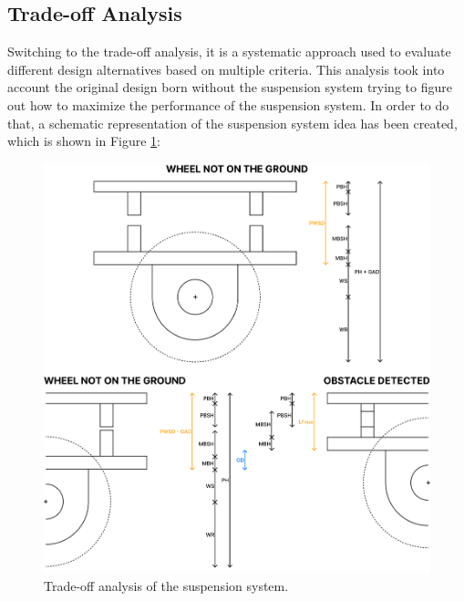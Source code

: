 \documentclass[11pt]{article}
\begin{document}
\newpage

\subsection{Trade-off Analysis}
Switching to the trade-off analysis, it is a systematic approach used to evaluate different design alternatives based on multiple criteria. This analysis took into account the original design born without the suspension system trying to figure out how to maximize the performance of the suspension system. In order to do that, a schematic representation of the suspension system idea has been created, which is shown in Figure \ref{fig:trade_off_analysis}:
\begin{figure}[H]
    \centering
    \includegraphics[width=\textwidth]{images/Trade-off Analysis.png}
    \caption{Trade-off analysis of the suspension system.}
    \label{fig:trade_off_analysis}
\end{figure}
\end{document}
